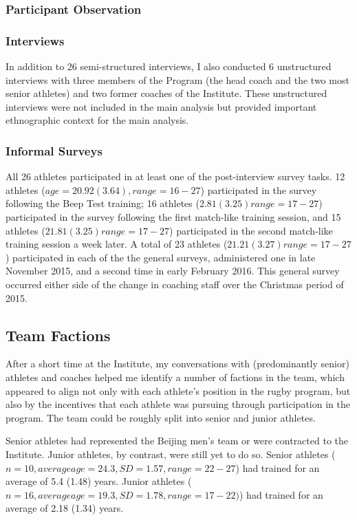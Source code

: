 \begin{CJK}{UTF8}{gbsn}
\subsubsection{Participant Observation}

  \subsubsection{Interviews}

  In addition to 26 semi-structured interviews, I also conducted 6 unstructured interviews with three members of the Program (the head coach and the two most senior athletes) and two former coaches of the Institute.  These unstructured interviews were not included in the main analysis but provided important ethnographic context for the main analysis.

  \subsubsection{Informal Surveys}

  All 26 athletes participated in at least one of the post-interview survey tasks. 12 athletes ($age = 20.92(3.64), range = 16 - 27$) participated in the survey following the Beep Test training; 16 athletes ($2.81 (3.25) range = 17 - 27$) participated in the survey following the first match-like training session, and 15 athletes ($21.81 (3.25) range = 17 - 27$) participated in the second match-like training session a week later.  A total of 23 athletes ($21.21 (3.27) range = 17-27$) participated in each of the the general surveys, administered one in late November 2015, and a second time in early February 2016. This general survey occurred either side of the change in coaching staff over the Christmas period of 2015.


\subsection{Team Factions\label{sect:teamFactions}}

After a short time at the Institute, my conversations with (predominantly senior) athletes and coaches helped me identify a number of factions in the team, which appeared to align not only with each athlete's position in the rugby program, but also by the incentives that each athlete was pursuing through participation in the program. The team could be roughly split into senior and junior athletes.

Senior athletes had represented the Beijing men's team or were contracted to the Institute. Junior athletes, by contrast, were still yet to do so.  Senior athletes  ($n = 10, average age = 24.3, SD = 1.57, range = 22 - 27$) had trained for an average of 5.4 (1.48) years.  Junior athletes ($n = 16, average age = 19.3, SD = 1.78, range = 17 - 22)$) had trained for an average of 2.18 (1.34) years.



\end{CJK}
